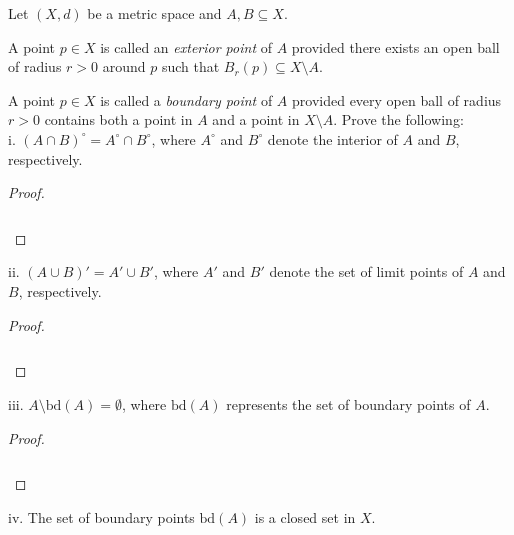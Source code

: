 Let $(X, d)$ be a metric space and $A, B \subseteq X$. 

A point $p \in X$ is called an \emph{exterior point} of $A$ provided there exists an open ball of radius $r > 0$ around
$p$ such that $B_r(p) \subseteq X \setminus A$.

A point $p \in X$ is called a \emph{boundary point} of $A$ provided every open ball of radius $r > 0$ contains both
a point in $A$ and a point in $X \setminus A$. Prove the following: \\

i.  $(A \cap B)^{\circ} = A^{\circ} \cap B^{\circ}$, where $A^{\circ}$ and $B^{\circ}$ denote the interior of $A$ and 
    $B$, respectively. \ \\

\begin{proof}\renewcommand{\qedsymbol}{}\ \\\\
    \begin{align*}
    \end{align*}
\end{proof}

\pagebreak

ii.  $(A \cup B)' = A' \cup B'$, where $A'$ and $B'$ denote the set of limit points of $A$ and $B$, respectively.\ \\

\begin{proof}\renewcommand{\qedsymbol}{}\ \\\\
    \begin{align*}
    \end{align*}
\end{proof}

\pagebreak

iii. $A \setminus \text{bd}(A) = \emptyset$, where $\text{bd}(A)$ represents the set of boundary points of $A$.  \ \\

\begin{proof}\renewcommand{\qedsymbol}{}\ \\\\
    \begin{align*}
    \end{align*}
\end{proof}

\pagebreak

iv. The set of boundary points $\text{bd}(A)$ is a closed set in $X$.  \ \\
    
